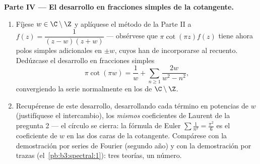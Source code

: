 \begin{problem}
\medskip
\noindent\textbf{Parte IV --- El desarrollo en fracciones simples de la
cotangente.}
\begin{enumerate}[resume]
  \item Fíjese $w \in \C\setminus\Z$ y aplíquese el método de la Parte
  II a $f(z) = \dfrac{1}{(z - w)(z + w)}$ --- obsérvese que
  $\pi\cot(\pi z)f(z)$ tiene ahora polos simples adicionales en $\pm w$,
  cuyos  han de
  incorporarse al recuento. Dedúzcase el desarrollo en fracciones
  simples
        \[
        \pi\cot(\pi w) = \frac1w +
        \sum_{n\geq1}\frac{2w}{w^2 - n^2},
        \]
        convergiendo la serie normalmente en los
         de
        $\C\setminus\Z$.
  \item Recupérense de este desarrollo, desarrollando cada término en
  potencias de $w$ (justifíquese el intercambio), los \emph{mismos}
  coeficientes de Laurent de la pregunta 2 --- el círculo se cierra: la
  fórmula de Euler $\sum\frac1{n^2} = \frac{\pi^2}6$ es el coeficiente
  de $w$ en las dos caras de la cotangente. Compárese con la
  demostración por series de Fourier (segundo año) y con la demostración
  por trazas (el~\cref{pb:b3:spectral:1}): tres teorías, un número.
\end{enumerate}


\end{problem}
